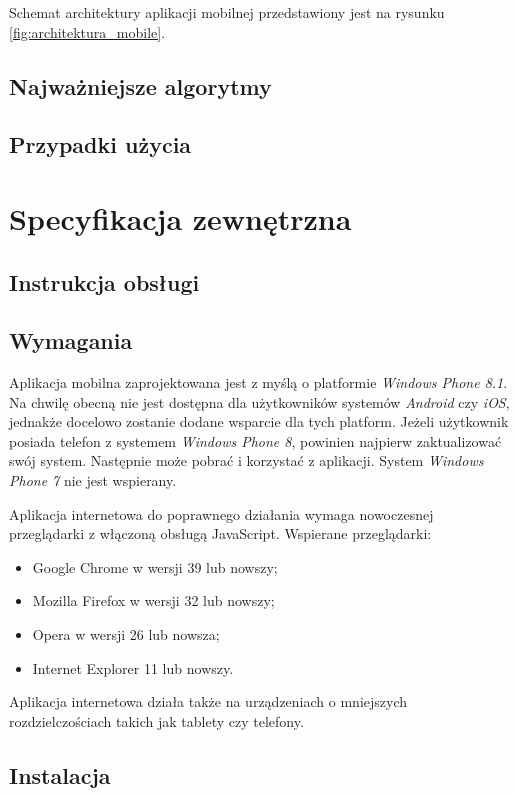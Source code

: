 \documentclass{book}
\begin{document}
			Schemat architektury aplikacji mobilnej przedstawiony jest na rysunku \ref{fig:architektura_mobile}. 
			
		
		\section{Najważniejsze algorytmy}
		\section{Przypadki użycia}
		
		
	\chapter{Specyfikacja zewnętrzna}
		\section{Instrukcja obsługi}
		\section{Wymagania}
		
		Aplikacja mobilna zaprojektowana jest z myślą o platformie \emph{Windows Phone 8.1}. Na chwilę obecną nie jest dostępna dla użytkowników systemów \emph{Android} czy \emph{iOS}, jednakże docelowo zostanie dodane wsparcie dla tych platform. Jeżeli użytkownik posiada telefon z systemem \emph{Windows Phone 8}, powinien najpierw zaktualizować swój system. Następnie może pobrać i korzystać z aplikacji. System \emph{Windows Phone 7} nie jest wspierany.
		
		Aplikacja internetowa do poprawnego działania wymaga nowoczesnej przeglądarki z włączoną obsługą JavaScript. Wspierane przeglądarki:
		\begin{itemize}
			\item Google Chrome w wersji 39 lub nowszy;
			\item Mozilla Firefox w wersji 32 lub nowszy;
			\item Opera w wersji 26 lub nowsza;
			\item Internet Explorer 11 lub nowszy.
		\end{itemize}
		
		Aplikacja internetowa działa także na urządzeniach o mniejszych rozdzielczościach takich jak tablety czy telefony.
		
		\section{Instalacja}
		
\end{document}
